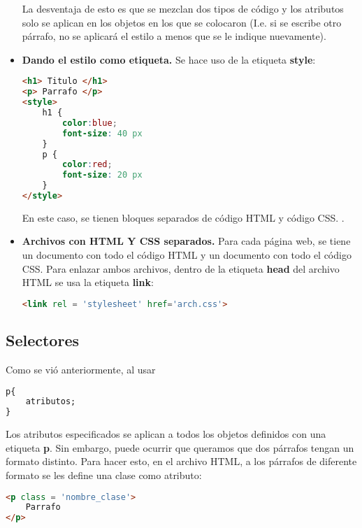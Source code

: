 \documentclass[10pt,oneside]{article}
\begin{document}
\begin{multicols}{2}
\begin{itemize}
        La desventaja de esto es que se mezclan dos tipos de código y los atributos solo se aplican en los objetos en los que se colocaron (I.e. si se escribe otro párrafo, no se aplicará el estilo a menos que se le indique nuevamente).
        
        \item \textbf{Dando el estilo como etiqueta.} Se hace uso de la etiqueta \textbf{style}:
        
        \begin{lstlisting}[language=HTML]
<h1> Titulo </h1>
<p> Parrafo </p>
<style>
    h1 {
        color:blue;
        font-size: 40 px
    }
    p {
        color:red;
        font-size: 20 px
    }
</style>
        \end{lstlisting} 

        En este caso, se tienen bloques separados de código HTML y código CSS. .

        \item \textbf{Archivos con HTML Y CSS separados.} Para cada página web, se tiene un documento con todo el código HTML y un documento con todo el código CSS. Para enlazar ambos archivos, dentro de la etiqueta \textbf{head} del archivo HTML se usa la etiqueta \textbf{link}:

        \begin{lstlisting}[language=HTML]
<link rel = 'stylesheet' href='arch.css'>
        \end{lstlisting}
    \end{itemize}

\subsection{Selectores}

    Como se vió anteriormente, al usar

    \begin{lstlisting}[language=HTML]
p{
    atributos;
}
    \end{lstlisting}

    Los atributos especificados se aplican a todos los objetos definidos con una etiqueta \textbf{p}. Sin embargo, puede ocurrir que queramos que dos párrafos tengan un formato distinto. Para hacer esto, en el archivo HTML, a los párrafos de diferente formato se les define una clase como atributo:

    \begin{lstlisting}[language=HTML]
<p class = 'nombre_clase'>
    Parrafo
</p>
    \end{lstlisting}


\end{multicols}
\end{document}
